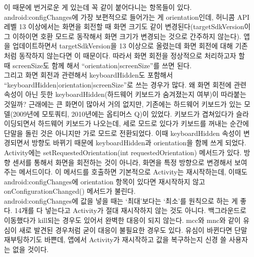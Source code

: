 이 때문에 번거로운 게 있는데 꼭 같이 붙어다니는 항목들이 있다.
android:configChanges에 가장 보편적으로 들어가는 게 orientation인데, 허니콤 API 레벨 13 이상에서는 화면을 회전할 때 화면 크기도 같이 변경된다(targetSdkVersion이 그 이하이면 호환 모드로 동작해서 화면 크기가 변경되는 것으로 간주하지 않는다).
앱을 업데이트하면서 targetSdkVersion을 13 이상으로 올렸는데 화면 회전에 대해 기존처럼 동작하지 않는다면 이 때문이다. 
따라서 화면 회전을 정상적으로 처리하고자 할 때 screenSize도 함께 해서 ``orientation|screenSize''를 쓰면 된다.\\

그리고 화면 회전과 관련해서 keyboardHidden도 포함해서 ``keyboardHidden|orientation|screenSize''로 쓰는 경우가 많다.
왜 화면 회전에 관련 속성이 아닌 듯한 keyboardHidden(하드웨어 키보드가 숨겨졌는지 여부)이 따라붙는 것일까?
근래에는 큰 화면이 많아서 거의 없지만, 기존에는 하드웨어 키보드가 있는 모델(2009년에 모토쿼티, 2010년에는 옵티머스 Q)이 있었다.
키보드가 겹쳐있다가 슬라이딩되면서 하드웨어 키보드가 나오는데, 세로 모드로 있다가 키보드를 꺼내는 순간에 단말을 돌린 것은 아니지만 가로 모드로 전환되었다. 
이때 keyboardHidden 속성이 변경되면서 방향도 바뀌기 때문에 keyboardHidden과 orientation을 함께 쓰게 되었다.\\

Activity에는 setRequestedOrientation(int requestedOrientation) 메서드가 있다. 방향 센서를 통해서 화면을 회전하는 것이 아니라, 화면을 특정 방향으로 변경해서 보여주는 메서드이다.
이 메서드를 호출하면 기본적으로 Activity는 재시작하는데, 이때도 android:configChanges에 orientation 항목이 있다면 재시작하지 않고 onConfigurationChanged() 메서드가 불린다.\\

android:configChanges에 값을 넣을 때는 `최대'보다는 `최소'를 원칙으로 하는 게 좋다. 14개를 다 넣는다고 Activity가 절대 재시작하지 않는 것도 아니다. 
백그라운드로 이동했다가 kill되는 경우도 있어서 완벽한 대응이 되지 않는다. 
mcc와 mnc와 같이 유심이 새로 발견된 경우처럼 굳이 대응이 불필요한 경우도 있다. 유심이 바뀐다면 단말 재부팅하기도 바쁜데, 앱에서 Activity가 재시작하고 값을 복구하는지 신경 쓸 사용자는 없을 것이다.\\

